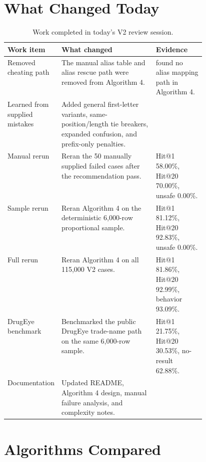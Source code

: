 \documentclass[11pt]{article}
\newcommand{\id}[1]{\texttt{\expandafter\seqsplit\expandafter{\detokenize{#1}}}}
\begin{document}
\section{What Changed Today}

\begin{table}[H]
\centering
\small
\begin{tabularx}{\linewidth}{L{0.21\linewidth}Y L{0.25\linewidth}}
\toprule
\textbf{Work item} & \textbf{What changed} & \textbf{Evidence} \\
\midrule
Removed cheating path &
The manual alias table and alias rescue path were removed from Algorithm 4. &
\id{rg} found no alias mapping path in Algorithm 4. \\
Learned from supplied mistakes &
Added general first-letter variants, same-position/length tie breakers,
expanded \id{M/N} confusion, and prefix-only penalties. &
 \\
Manual rerun &
Reran the 50 manually supplied failed cases after the recommendation pass. &
Hit@1 58.00\%, Hit@20 70.00\%, unsafe 0.00\%. \\
Sample rerun &
Reran Algorithm 4 on the deterministic 6,000-row proportional sample. &
Hit@1 81.12\%, Hit@20 92.83\%, unsafe 0.00\%. \\
Full rerun &
Reran Algorithm 4 on all 115,000 V2 cases. &
Hit@1 81.86\%, Hit@20 92.99\%, behavior 93.09\%. \\
DrugEye benchmark &
Benchmarked the public DrugEye trade-name path on the same 6,000-row sample. &
Hit@1 21.75\%, Hit@20 30.53\%, no-result 62.88\%. \\
Documentation &
Updated README, Algorithm 4 design, manual failure analysis, and complexity notes. &
 \\
\bottomrule
\end{tabularx}
\caption{Work completed in today's V2 review session.}
\end{table}

\section{Algorithms Compared}
\end{document}
